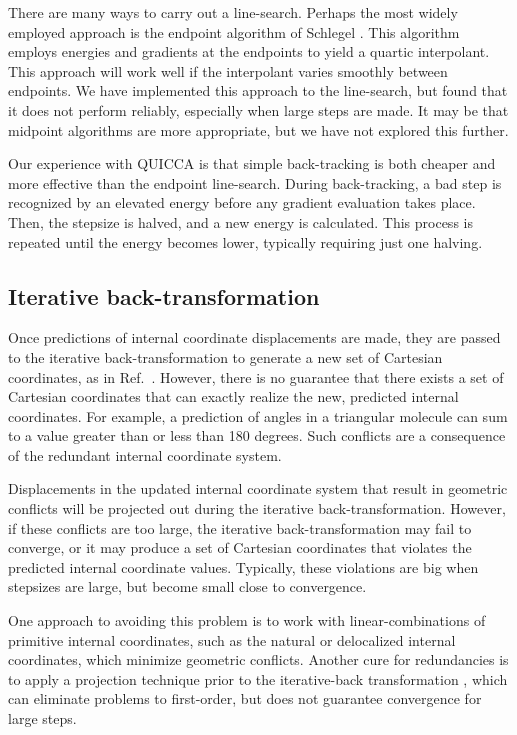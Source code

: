 \documentclass[prl,twocolumn,showpacs,twocolumngrid,superbib]{revtex4}
\begin{document}
There are many ways to carry out a line-search.  Perhaps the most widely employed 
approach is the endpoint algorithm of Schlegel \cite{HSchlegel82}.  This algorithm
employs energies and gradients at the endpoints to yield a quartic interpolant.  This
approach will work well if the interpolant varies smoothly between endpoints.  We have
implemented this approach to the line-search, but found that it does not perform 
reliably, especially when large steps are made.   It may be that midpoint algorithms
are more appropriate, but we have not explored this further.

Our experience with QUICCA is that simple back-tracking is both cheaper and more effective
than the endpoint line-search.  During back-tracking, a  bad step is recognized by an elevated
energy before any gradient evaluation takes place. Then, the stepsize is halved,
and a new energy is calculated.  This process is repeated until the energy becomes lower,
typically requiring just one halving.

\subsection{Iterative back-transformation}\label{transformation}

Once predictions of internal coordinate displacements are made, they are passed to the 
iterative back-transformation to generate a new set of Cartesian coordinates, as in 
Ref.~.   However, there is no guarantee that there exists a set of 
Cartesian coordinates that can exactly realize the new, predicted internal coordinates.  
For example, a prediction of angles in a triangular molecule can sum 
to a value greater than or less than 180 degrees. Such conflicts are a consequence of 
the redundant internal coordinate system.  

Displacements in the updated internal coordinate system that result in geometric conflicts 
will be projected out during the iterative back-transformation. However, if 
these conflicts are too large, the iterative back-transformation may fail to converge,
or it may produce a set of Cartesian coordinates that violates the predicted internal 
coordinate values. Typically, these violations are big when stepsizes are large, but become 
small close to convergence.  

One approach to avoiding this problem is to work with linear-combinations of primitive internal
coordinates, such as the natural \cite{GFogarasi92} or delocalized
\cite{JBaker96} internal coordinates, which minimize geometric conflicts.  
Another cure for redundancies is to apply a projection technique prior to the iterative-back 
transformation \cite{PPulay77}, which can eliminate problems to first-order, but does not 
guarantee convergence for large steps.
\end{document}
